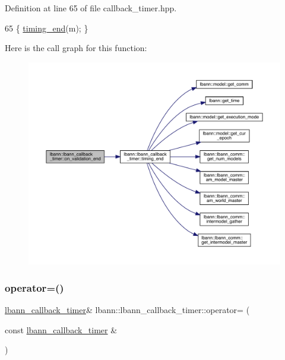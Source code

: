 Definition at line 65 of file callback\+\_\+timer.\+hpp.


\begin{DoxyCode}
65 \{ \hyperlink{classlbann_1_1lbann__callback__timer_a955e59858c6803e96b21fe494cdf3971}{timing\_end}(m); \}
\end{DoxyCode}
Here is the call graph for this function\+:\nopagebreak
\begin{figure}[H]
\begin{center}
\leavevmode
\includegraphics[width=350pt]{classlbann_1_1lbann__callback__timer_a0fea502078111627d340340a63768f9f_cgraph}
\end{center}
\end{figure}
\mbox{\label{classlbann_1_1lbann__callback__timer_ab7548a88159197f64dfc319f3e777c2a}} 
\subsubsection{\texorpdfstring{operator=()}{operator=()}}
{\footnotesize\ttfamily \hyperlink{classlbann_1_1lbann__callback__timer}{lbann\+\_\+callback\+\_\+timer}\& lbann\+::lbann\+\_\+callback\+\_\+timer\+::operator= (\begin{DoxyParamCaption}\item[{const \hyperlink{classlbann_1_1lbann__callback__timer}{lbann\+\_\+callback\+\_\+timer} \&}]{ }\end{DoxyParamCaption})\hspace{0.3cm}{\ttfamily [default]}}

